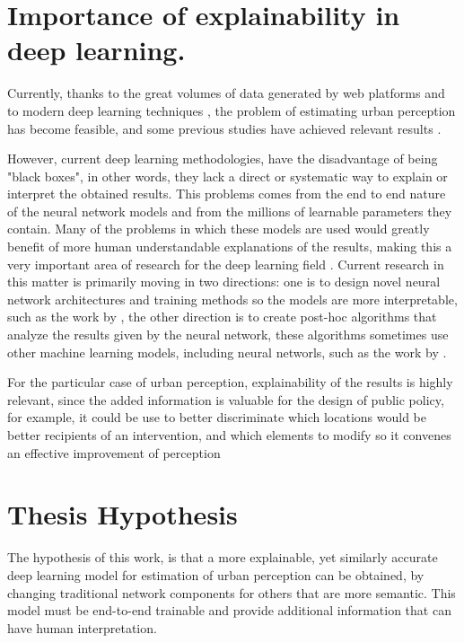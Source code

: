 \section{Importance of explainability in deep learning.}

Currently, thanks to the great volumes of data generated by web platforms \cite{hidalgo_inequality}
and to modern deep learning techniques \cite{lecun_dl}, the problem of estimating urban perception
has become feasible, and some previous studies have achieved relevant results \cite{hidalgo_placepulse,rossetti}.

However, current deep learning methodologies, have the disadvantage of being "black boxes", in other
words, they lack a direct or systematic way to explain or interpret the obtained results. This problems
comes from the end to end nature of the neural network models and from the millions of learnable parameters
they contain. Many of the problems in which these models are used would greatly benefit of more
human understandable explanations of the results, making this a very important area of
research for the deep learning field \cite{adadi_xai}.  Current research in this matter is primarily
moving in two directions: one is to design novel neural network architectures and training methods so
the models are more interpretable, such as the work by , the other
direction is to  create post-hoc algorithms \cite{adadi_xai} that analyze the results given by the
neural network, these algorithms sometimes use other machine learning models, including neural networls,
such as the work by .

For the particular case of urban perception, explainability of the results is highly relevant, since
the added information is valuable for the design of public policy, for example, it could be use to
better discriminate which locations would be better recipients of an intervention, and which elements
to modify so it convenes an effective improvement of perception

\section{Thesis Hypothesis}

The hypothesis of this work, is that a more explainable, yet similarly accurate
deep learning model for estimation of urban perception can be obtained, by changing traditional
network components for others that are more semantic. This model must be end-to-end trainable
and provide additional information that can have human interpretation.